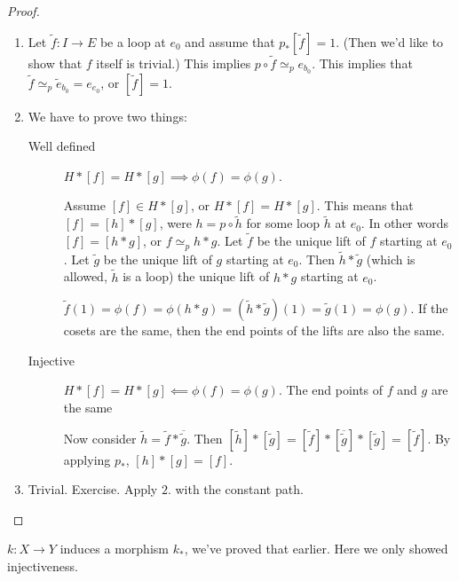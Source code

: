 \begin{proof}
    \begin{enumerate}
        \item Let $\tilde f: I \to  E$ be a loop at $e_0$ and assume that $p_*[\tilde f] = 1$. (Then we'd like to show that $f$ itself is trivial.)
            This implies $p  \circ  \tilde f \simeq_p  e_{b_0}$.
            This implies that $\tilde f \simeq_p \tilde e_{b_0} = e_{e_0}$, or $[\tilde f] = 1$.
        \item We have to prove two things: 
            \begin{description}
                \item [Well defined] $H*[f] = H*[g] \implies \phi(f) = \phi(g)$.

                    Assume $[f] \in H * [g]$, or $H*[f] = H*[g]$.
                    This means that  $[f] = [h] * [g]$, were  $h = p  \circ  \tilde h$ for some loop $\tilde h$ at $e_0$.
                    In other words $[f] = [h*g]$, or  $f \simeq_p  h*g$.
                    Let $\tilde f$ be the unique lift of $f$ starting at $e_0$.
                    Let $\tilde g$ be the unique lift of  $g$ starting at $e_0.$
                    Then $\tilde h * \tilde g$ (which is allowed, $\tilde h$ is a loop) the unique lift of $h * g$ starting at $e_0$.


                    $\tilde f(1) = \phi(f) = \phi(h * g) = (\tilde h * \tilde g)(1) = \tilde g(1) = \phi(g)$.
                    If the cosets are the same, then the end points of the lifts are also the same.
                \item [Injective]$H*[f] = H*[g] \impliedby \phi(f) = \phi(g)$.
                    The end points of $f$ and $g$ are the same

                    Now consider $\tilde h = \tilde f * \overline{\tilde g}$.
                    Then $[ \tilde h]*[\tilde g] = [\tilde f] * [\overline{\tilde g}] * [\tilde g] = [\tilde f]$.
                    By applying $p_*$,  $[h]*[g] = [f]$.
            \end{description}
        \item Trivial. Exercise. Apply $2.$ with the constant path.
    \end{enumerate}
\end{proof}
\begin{remark}
    $k: X \to  Y$ induces a morphism $k_*$, we've proved that earlier. Here we only showed injectiveness.
\end{remark}

